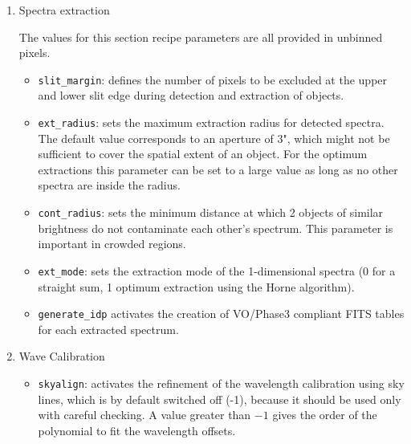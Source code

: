 \begin{enumerate}
\begin{itemize}
\item {\tt cosmics}: performs a cosmic ray rejection on the 2-dimensional frame (only if {\tt skylocal} or {\tt skyglobal} are activated), which is not very robust. Usually the optimum extraction removes all cosmic ray hits. If {\tt cosmics} is used the results should be compared to the results without using {\tt cosmics} to check for artefacts.

\end{itemize}

\item Spectra extraction 

The values for this section recipe parameters are all provided in unbinned pixels.

\begin{itemize}

\item {\tt slit\_margin}: defines the number of pixels to be excluded at the upper and lower slit edge during detection and extraction of objects.

\item {\tt ext\_radius}: sets the maximum extraction radius for detected spectra. The default value corresponds to an aperture of 3", which might not be sufficient to cover the spatial extent of an object.
For the optimum extractions this parameter can be set to a large value as long as no other spectra are inside the radius.

 \item {\tt cont\_radius}: sets the minimum distance at which 2 objects of similar brightness do not contaminate each other’s spectrum. This parameter is important in crowded regions.

 \item {\tt ext\_mode}: sets the extraction mode of the 1-dimensional spectra (0 for a straight sum, 1 optimum extraction using the Horne algorithm).
 
\item {\tt generate\_idp} activates the creation of VO/Phase3 compliant FITS tables for each extracted spectrum.

\end{itemize}

\item Wave Calibration

\begin{itemize}
\item {\tt skyalign}: activates the refinement of the wavelength calibration using sky lines, which is by default switched off (-1), because it should be used only with careful checking. A value greater than $-1$ gives the order of the polynomial to fit the wavelength offsets.

\end{itemize}

\end{enumerate}


